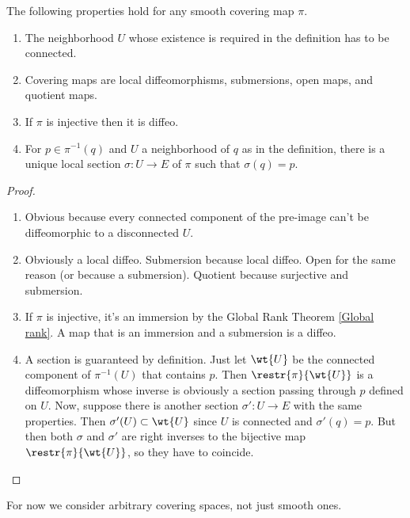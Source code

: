 \begin{prop}The following properties hold for any smooth covering map $\pi$.
\begin{enumerate}
    \item The neighborhood $U$ whose existence is required in the definition has to be connected.
    \item Covering maps are local diffeomorphisms, submersions, open maps, and quotient maps.
    \item If $\pi $ is injective then it is diffeo.
    \item For $p\in \pi^{-1}(q)$ and $U$ a neighborhood of $q$ as in the definition, there is a unique local section $\sigma:U\to E$ of $\pi$ such that $\sigma(q)=p$.
\end{enumerate}
\end{prop}
\begin{proof}
\begin{enumerate}
    \item Obvious because every connected component of the pre-image can't be diffeomorphic to a disconnected $U$.
    \item Obviously a local diffeo. Submersion because local diffeo. Open for the same reason (or because a submersion). Quotient because surjective and submersion.
    \item If $\pi$ is injective, it's an immersion by the Global Rank Theorem \ref{Global rank}. A map that is an immersion and a submersion is a diffeo.
    \item A section is guaranteed by definition. Just let $\wt{U}$ be the connected component of $\pi^{-1}(U)$ that contains $p$. Then $\restr{\pi}{\wt{U}}$ is a diffeomorphism whose inverse is obviously a section passing through $p$ defined on $U$. Now, suppose there is another section $\sigma':U\to E$ with the same properties. Then $\sigma'(U)\subset \wt{U}$ since $U$ is connected and $\sigma'(q)=p$. But then both $\sigma$ and $\sigma'$ are right inverses to the bijective map $\restr{\pi}{\wt{U}}$, so they have to coincide.
\end{enumerate}
\end{proof}

For now we consider arbitrary covering spaces, not just smooth ones.

